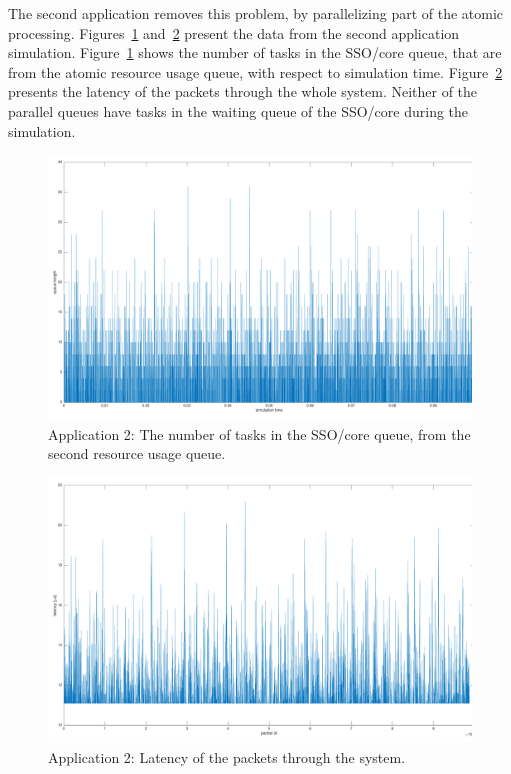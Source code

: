 The second application removes this problem, by parallelizing part of the atomic processing. Figures~\ref{fig:app2-queue2} and~\ref{fig:app2-latency} present the data from the second application simulation. Figure~\ref{fig:app2-queue2} shows the number of tasks in the SSO/core queue, that are from the atomic resource usage queue, with respect to simulation time. Figure~\ref{fig:app2-latency} presents the latency of the packets through the whole system. Neither of the parallel queues have tasks in the waiting queue of the SSO/core during the simulation.

\begin{figure}[]
  \begin{center}
    \includegraphics[width=\textwidth]{images/app2-queue2.pdf}
    \caption{Application 2: The number of tasks in the SSO/core queue, from the second resource usage queue.}
    \label{fig:app2-queue2}
  \end{center}
\end{figure}

\begin{figure}[]
  \begin{center}
    \includegraphics[width=\textwidth]{images/app2-latency.pdf}
    \caption{Application 2: Latency of the packets through the system.}
    \label{fig:app2-latency}
  \end{center}
\end{figure}

